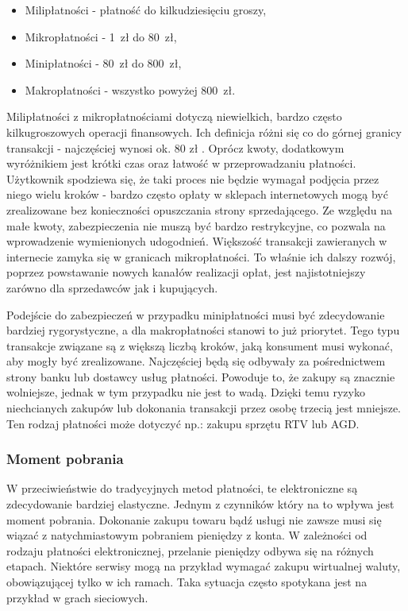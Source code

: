 \begin{itemize}
	\item Milipłatności - płatność do kilkudziesięciu groszy,
	\item Mikropłatności - 1~zł do 80~zł,
	\item Minipłatności - 80~zł do 800~zł,
	\item Makropłatności - wszystko powyżej 800~zł. 
\end{itemize}

Milipłatności z mikropłatnościami dotyczą niewielkich, bardzo często 
kilkugroszowych operacji finansowych. Ich definicja różni się co do górnej 
granicy transakcji - najczęściej wynosi ok. 80 zł 
\cite{rodzaje_platnosci}\cite{elektroniczne_metody_platnosci}. Oprócz kwoty, 
dodatkowym wyróżnikiem jest krótki czas oraz łatwość w przeprowadzaniu 
płatności. Użytkownik spodziewa się, że taki proces nie będzie wymagał podjęcia 
przez niego wielu kroków - bardzo często opłaty w sklepach internetowych mogą 
być zrealizowane bez konieczności opuszczania strony sprzedającego. Ze względu 
na małe kwoty, zabezpieczenia nie muszą być bardzo restrykcyjne, co pozwala na 
wprowadzenie wymienionych udogodnień. Większość transakcji zawieranych w 
internecie zamyka się w granicach mikropłatności. To właśnie ich dalszy rozwój, 
poprzez powstawanie nowych kanałów realizacji opłat, jest najistotniejszy 
zarówno dla sprzedawców jak i kupujących.

Podejście do zabezpieczeń w przypadku minipłatności musi być zdecydowanie 
bardziej rygorystyczne, a dla makropłatności stanowi to już priorytet. Tego 
typu transakcje związane są z większą liczbą kroków, jaką konsument musi 
wykonać, aby mogły być zrealizowane. Najczęściej będą się odbywały za 
pośrednictwem strony banku lub dostawcy usług płatności. Powoduje to, że zakupy 
są znacznie wolniejsze, jednak w tym przypadku nie jest to wadą. Dzięki  temu 
ryzyko niechcianych zakupów lub dokonania transakcji przez osobę trzecią jest 
mniejsze. Ten rodzaj płatności może dotyczyć np.: zakupu sprzętu RTV lub AGD.

\subsubsection*{Moment pobrania}

W przeciwieństwie do tradycyjnych metod płatności, te elektroniczne są zdecydowanie bardziej elastyczne. Jednym z czynników który na to wpływa jest  moment pobrania. 
Dokonanie zakupu towaru bądź usługi nie zawsze musi się wiązać z 
natychmiastowym pobraniem pieniędzy z konta. W zależności od rodzaju płatności 
elektronicznej, przelanie pieniędzy odbywa się na różnych etapach. Niektóre 
serwisy mogą na przykład wymagać zakupu wirtualnej waluty, obowiązującej tylko 
w ich ramach. Taka sytuacja często spotykana jest na przykład w grach sieciowych. 

